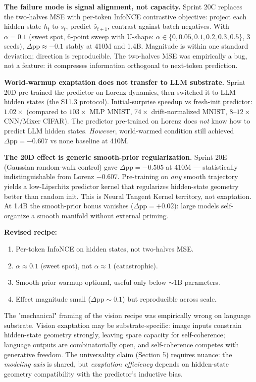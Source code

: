 \documentclass[11pt]{article}
\begin{document}
\textbf{The failure mode is signal alignment, not capacity.} Sprint 20C replaces the two-halves MSE with per-token InfoNCE contrastive objective: project each hidden state $h_t$ to $s_t$, predict $\hat{s}_{t+1}$, contrast against batch negatives. With $\alpha=0.1$ (sweet spot, 6-point sweep with U-shape: $\alpha \in \{0, 0.05, 0.1, 0.2, 0.3, 0.5\}$, 3 seeds), $\Delta\text{pp} \approx -0.1$ stably at 410M and 1.4B. Magnitude is within one standard deviation; direction is reproducible. The two-halves MSE was empirically a bug, not a feature: it compresses information orthogonal to next-token prediction.

\textbf{World-warmup exaptation does not transfer to LLM substrate.} Sprint 20D pre-trained the predictor on Lorenz dynamics, then switched it to LLM hidden states (the S11.3 protocol). Initial-surprise speedup vs fresh-init predictor: $1.02\times$ (compared to $103\times$ MLP MNIST, $74\times$ drift-normalized MNIST, $8$--$12\times$ CNN/Mixer CIFAR). The predictor pre-trained on Lorenz does \emph{not} know how to predict LLM hidden states. \emph{However}, world-warmed condition still achieved $\Delta\text{pp} = -0.607$ vs none baseline at 410M.

\textbf{The 20D effect is generic smooth-prior regularization.} Sprint 20E (Gaussian random-walk control) gave $\Delta\text{pp} = -0.505$ at 410M --- statistically indistinguishable from Lorenz $-0.607$. Pre-training on \emph{any} smooth trajectory yields a low-Lipschitz predictor kernel that regularizes hidden-state geometry better than random init. This is Neural Tangent Kernel territory, not exaptation. At 1.4B the smooth-prior bonus vanishes ($\Delta\text{pp}=+0.02$): large models self-organize a smooth manifold without external priming.

\textbf{Revised recipe:}
\begin{enumerate}
    \item Per-token InfoNCE on hidden states, not two-halves MSE.
    \item $\alpha \approx 0.1$ (sweet spot), not $\alpha \approx 1$ (catastrophic).
    \item Smooth-prior warmup optional, useful only below $\sim 1$B parameters.
    \item Effect magnitude small ($\Delta\text{pp} \sim 0.1$) but reproducible across scale.
\end{enumerate}

The "mechanical" framing of the vision recipe was empirically wrong on language substrate. Vision exaptation may be substrate-specific: image inputs constrain hidden-state geometry strongly, leaving spare capacity for self-coherence; language outputs are combinatorially open, and self-coherence competes with generative freedom. The universality claim (Section 5) requires nuance: the \emph{modeling axis} is shared, but \emph{exaptation efficiency} depends on hidden-state geometry compatibility with the predictor's inductive bias.
\end{document}
